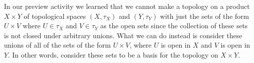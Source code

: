 \begin{comment}

\ActivitySolution

\be
\item  We take all products of open sets in $X$ and $Y$ to obtain the basis elements
\begin{align*}
\emptyset & \\
\{a\} \times \{1\} &= \{(a,1)\} \\
\{a\} \times Y &= \{(a,1), (a,2)\} \\
\{b\} \times \{1\} &= \{(b,1)\} \\
\{b\} \times Y &= \{(b,1), (b,2)\} \\
\{a,b\} \times \{1\} &= \{(a,1), (b,1)\} \\
\{a,b\} \times Y &= \{(a,1), (a,2), (b,1), (b,2)\} \\
\{a,c\} \times \{1\} &= \{(a,1), (c,1)\} \\
\{a,c\} \times Y &= &= \{(a,1), (a,2), (c,1), (c,2)\}
X \times \{1\} &= \{(a,1), (b,1), (c,1)\} \\
X \times Y &= \{(a,1), (a,2), (b,1), (b,2), (c,1), (c,2)\}.
\end{align*}

 
\item  We have $A = (\{a\} \times Y) \cup (\{b\} \times \{1\})$, so $A$ is a union of open sets in $X \times Y$ and should be open. But $A$ is not of the form $U \times V$ for some open sets $U$ in $X$ and $V$ in $Y$, as it is not in the list of those sets in part (a). 


\item Since $\CB$ is not closed under unions, $\B$ is not a topology on $X \times Y$. However, if we consider all of the unions and finite intersections of sets in $\B$ we create the topology 
\[\{\emptyset, \{(a,1)\}, \{(b,1)\}, \{(a,1), (a,2)\}, \{(b,1), (b,2)\}, \{(a,1), (b,1)\}, \{(a,1), (c,1)\}, \{(a,1), (b,1), (b,2)\}, \{(a,1), (a,2), (b,1)\}, \{(a,1), (a,2), (c,1)\},  \{(a,1), (b,1), (c,1)\}, \{(a,1), (a,2), (b,1), (c,1)\}, \{(a,1), (b,1), (b,2), (c,1)\}, \{(a,1), (a,2), (b,1), (b,2)\}, \{(a,1), (a,2), (b,1), (b,2), (c,1)\}, X \times Y\}\]
on $X \times Y$. In other words, we consider $\CB$ a basis for a topology of $X \times Y$. 

\ee

\end{comment}



In our preview activity we learned that we cannot make a topology on a product $X \times Y$ of topological spaces $(X, \tau_X)$ and $(Y , \tau_Y)$ with just the sets of the form $U \times V$ where $U \in \tau_X$ and $V \in \tau_Y$ as the open sets since the collection of these sets is not closed under arbitrary unions. What we can do instead is consider these unions of all of the sets of the form $U \times V$, where $U$ is open in $X$ and $V$ is open in $Y$. In other words, consider these sets to be a basis for the topology on $X \times Y$. 

